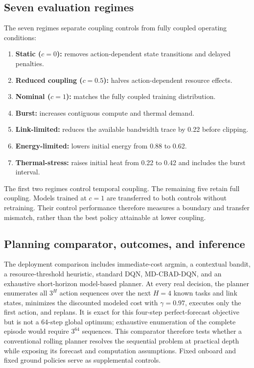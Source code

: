 \documentclass[11pt]{article}
\newcommand{\method}{MD-CBAD-DQN\xspace}
\begin{document}
\subsection{Seven evaluation regimes}

The seven regimes separate coupling controls from fully coupled operating conditions:

\begin{enumerate}[leftmargin=1.6em]
    \item \textbf{Static ($c=0$):} removes action-dependent state transitions and delayed penalties.
    \item \textbf{Reduced coupling ($c=0.5$):} halves action-dependent resource effects.
    \item \textbf{Nominal ($c=1$):} matches the fully coupled training distribution.
    \item \textbf{Burst:} increases contiguous compute and thermal demand.
    \item \textbf{Link-limited:} reduces the available bandwidth trace by 0.22 before clipping.
    \item \textbf{Energy-limited:} lowers initial energy from 0.88 to 0.62.
    \item \textbf{Thermal-stress:} raises initial heat from 0.22 to 0.42 and includes the burst interval.
\end{enumerate}

The first two regimes control temporal coupling. The remaining five retain full coupling. Models trained at $c=1$ are transferred to both controls without retraining. Their control performance therefore measures a boundary and transfer mismatch, rather than the best policy attainable at lower coupling.

\subsection{Planning comparator, outcomes, and inference}

The deployment comparison includes immediate-cost argmin, a contextual bandit, a resource-threshold heuristic, standard DQN, \method, and an exhaustive short-horizon model-based planner. At every real decision, the planner enumerates all $3^H$ action sequences over the next $H=4$ known tasks and link states, minimizes the discounted modeled cost with $\gamma=0.97$, executes only the first action, and replans. It is exact for this four-step perfect-forecast objective but is not a 64-step global optimum; exhaustive enumeration of the complete episode would require $3^{64}$ sequences. This comparator therefore tests whether a conventional rolling planner resolves the sequential problem at practical depth while exposing its forecast and computation assumptions. Fixed onboard and fixed ground policies serve as supplemental controls.
\end{document}
